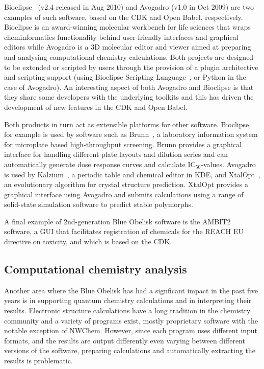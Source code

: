 \documentclass[10pt]{bmc_article}
\newenvironment{bmcformat}{\fussy\setboolean{publ}{true}}{\fussy}
\begin{document}
\begin{bmcformat}
Bioclipse~\cite{Spjuth:2007fk} (v2.4 released in Aug 2010) and Avogadro
\cite{WebAvogadro} (v1.0 in Oct 2009) are two examples of such software, based
on the CDK and Open Babel, respectively. Bioclipse is an award-winning
molecular workbench for life sciences
that wraps cheminformatics functionality behind user-friendly interfaces and
graphical editors while Avogadro is a 3D molecular editor and viewer aimed at
preparing and analysing computational chemistry calculations. Both
projects are designed to be extended or scripted by users through
the provision of a plugin architective and scripting support (using
Bioclipse Scripting Language~\cite{Bioclipse2}, or Python in the case
of Avogadro). An interesting aspect of both Avogadro and Bioclipse is
that they share some developers with the underlying toolkits and this
has driven the development of new features in the CDK and Open Babel.

Both products in turn act as extensible platforms for other
software. Bioclipse, for example is used by software
such as Brunn~\cite{Alvarsson:2011fk}, a laboratory information system for
microplate based high-throughput screening. Brunn provides a graphical interface
for handling different plate layouts and dilution series and can automatically
generate dose response curves and calculate IC$_{50}$-values. Avogadro
is used by Kalzium~\cite{WebKalzium}, a periodic table and chemical editor in KDE,
and XtalOpt~\cite{WebXtalOpt}\cite{Lonie2011}, an evolutionary
algorithm for crystal structure prediction. XtalOpt provides a
graphical interface using Avogadro and submits calculations using a
range of solid-state simulation software to predict stable polymorphs.

A final example of 2nd-generation Blue Obelisk software is the 
AMBIT2~\cite{WebAMBIT} software, a GUI that facilitates registration
of chemicals for the REACH EU directive on toxicity, and which is
based on the CDK.

\subsection*{Computational chemistry analysis}

Another area where the Blue Obelisk has had a signficant impact in the
past five years is in supporting
quantum chemistry calculations and in interpreting their results.
Electronic structure calculations have a long tradition in the
chemistry community and a variety of programs exist, mostly
proprietary software with the notable exception of NWChem.\cite{NWChem}
However, since each program uses different input formats, and the
results are output differently even varying between different versions
of the software, preparing calculations and automatically extracting
the results is problematic. 


\end{bmcformat}
\end{document}
